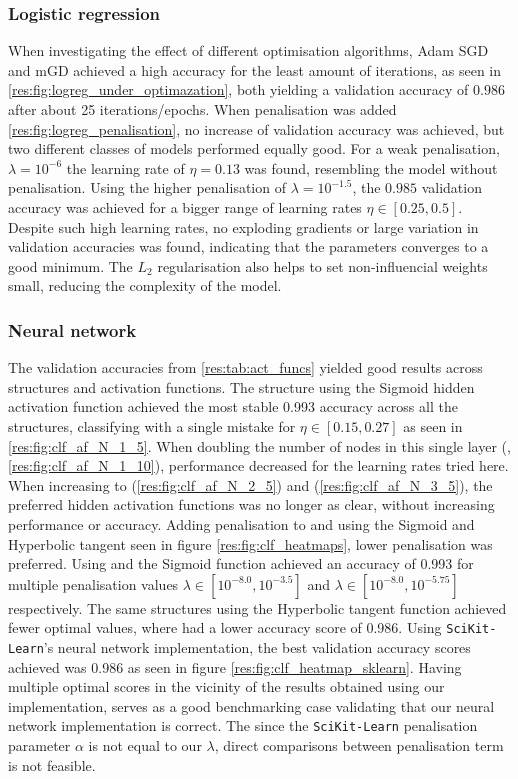         \subsubsection{Logistic regression}
        When investigating the effect of different optimisation algorithms, Adam SGD and mGD achieved a high accuracy for the least amount of iterations, as seen in \cref{res:fig:logreg_under_optimazation}, both yielding a validation accuracy of $0.986$ after about 25 iterations/epochs. When penalisation was added \cref{res:fig:logreg_penalisation}, no increase of validation accuracy was achieved, but two different classes of models performed equally good. For a weak penalisation, $\lambda = 10^{-6}$ the learning rate of $\eta = 0.13$ was found, resembling the model without penalisation. Using the higher penalisation of $\lambda = 10^{-1.5}$, the $0.985$ validation accuracy was achieved for a bigger range of learning rates $\eta \in [0.25, 0.5]$. Despite such high learning rates, no exploding gradients or large variation in validation accuracies was found, indicating that the parameters converges to a good minimum. The $L_2$ regularisation also helps to set non-influencial weights small, reducing the complexity of the model.

        \subsubsection{Neural network}
        The validation accuracies from \cref{res:tab:act_funcs} yielded good results across structures and activation functions. The  structure using the Sigmoid hidden activation function achieved the most stable 0.993 accuracy across all the structures, classifying with a single mistake for $\eta \in [0.15, 0.27]$ as seen in \cref{res:fig:clf_af_N_1_5}. When doubling the number of nodes in this single layer (, \cref{res:fig:clf_af_N_1_10}), performance decreased for the learning rates tried here. When increasing to  (\cref{res:fig:clf_af_N_2_5}) and  (\cref{res:fig:clf_af_N_3_5}), the preferred hidden activation functions was no longer as clear, without increasing performance or accuracy. Adding penalisation to  and  using the Sigmoid and Hyperbolic tangent seen in figure \cref{res:fig:clf_heatmaps}, lower penalisation was preferred. Using  and  the Sigmoid function achieved an accuracy of 0.993 for multiple penalisation values  $\lambda \in [10^{-8.0}, 10^{-3.5}]$ and $\lambda \in [10^{-8.0}, 10^{-5.75}]$ respectively. The same structures using the Hyperbolic tangent function achieved fewer optimal values, where  had a lower accuracy score of 0.986. Using \verb|SciKit-Learn|'s neural network implementation, the best validation accuracy scores achieved was 0.986 as seen in figure \cref{res:fig:clf_heatmap_sklearn}. Having multiple optimal scores in the vicinity of the results obtained using our implementation, serves as a good benchmarking case validating that our neural network implementation is correct. The since the \verb|SciKit-Learn| penalisation parameter $\alpha$ is not equal to our $\lambda$, direct comparisons between penalisation term is not feasible.


